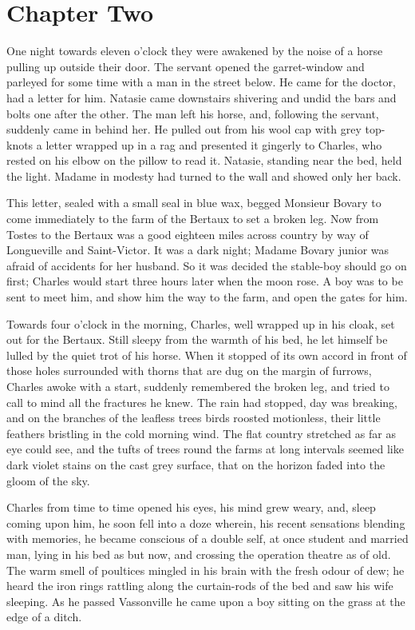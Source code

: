 \documentclass{tufte-book}
\begin{document}
\chapter*{Chapter Two}

One night towards eleven o'clock they were awakened by the noise of
a horse pulling up outside their door. The servant opened the
garret-window and parleyed for some time with a man in the street below.
He came for the doctor, had a letter for him. Natasie came downstairs
shivering and undid the bars and bolts one after the other. The man left
his horse, and, following the servant, suddenly came in behind her. He
pulled out from his wool cap with grey top-knots a letter wrapped up in
a rag and presented it gingerly to Charles, who rested on his elbow on
the pillow to read it. Natasie, standing near the bed, held the light.
Madame in modesty had turned to the wall and showed only her back.

This letter, sealed with a small seal in blue wax, begged Monsieur
Bovary to come immediately to the farm of the Bertaux to set a broken
leg. Now from Tostes to the Bertaux was a good eighteen miles across
country by way of Longueville and Saint-Victor. It was a dark night;
Madame Bovary junior was afraid of accidents for her husband. So it was
decided the stable-boy should go on first; Charles would start three
hours later when the moon rose. A boy was to be sent to meet him, and
show him the way to the farm, and open the gates for him.

Towards four o'clock in the morning, Charles, well wrapped up in his
cloak, set out for the Bertaux. Still sleepy from the warmth of his bed,
he let himself be lulled by the quiet trot of his horse. When it stopped
of its own accord in front of those holes surrounded with thorns that
are dug on the margin of furrows, Charles awoke with a start, suddenly
remembered the broken leg, and tried to call to mind all the fractures
he knew. The rain had stopped, day was breaking, and on the branches
of the leafless trees birds roosted motionless, their little feathers
bristling in the cold morning wind. The flat country stretched as far as
eye could see, and the tufts of trees round the farms at long intervals
seemed like dark violet stains on the cast grey surface, that on the
horizon faded into the gloom of the sky.

Charles from time to time opened his eyes, his mind grew weary, and,
sleep coming upon him, he soon fell into a doze wherein, his recent
sensations blending with memories, he became conscious of a double
self, at once student and married man, lying in his bed as but now, and
crossing the operation theatre as of old. The warm smell of poultices
mingled in his brain with the fresh odour of dew; he heard the iron
rings rattling along the curtain-rods of the bed and saw his wife
sleeping. As he passed Vassonville he came upon a boy sitting on the
grass at the edge of a ditch.
\end{document}
